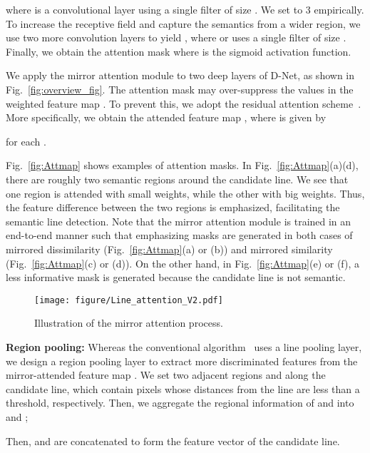 \documentclass[runningheads]{llncs}
\begin{document}
where  is a convolutional layer using a single filter of size . We set  to 3 empirically. To increase the receptive field and capture the semantics from a wider region, we use two more convolution layers to yield , where  or  uses a single filter of size . Finally, we obtain the attention mask  where  is the sigmoid activation function.

We apply the mirror attention module to two deep layers of D-Net, as shown in Fig.~\ref{fig:overview_fig}. The attention mask may over-suppress the values in the weighted feature map . To prevent this, we adopt the residual attention scheme~\cite{wang2017}. More specifically, we obtain the attended feature map , where  is given by

for each .

Fig.~\ref{fig:Attmap} shows examples of attention masks. In Fig.~\ref{fig:Attmap}(a)(d), there are roughly two semantic regions around the candidate line. We see that one region is attended with small weights, while the other with big weights. Thus, the feature difference between the two regions is emphasized, facilitating the semantic line detection. Note that the mirror attention module is trained in an end-to-end manner such that emphasizing masks are generated in both cases of mirrored dissimilarity (Fig.~\ref{fig:Attmap}(a) or (b)) and mirrored similarity (Fig.~\ref{fig:Attmap}(c) or (d)). On the other hand, in Fig.~\ref{fig:Attmap}(e) or (f), a less informative mask is generated because the candidate line is not semantic.

\begin{figure*}[t]

  \centering
  \texttt{[image: figure/Line\_attention\_V2.pdf]}


  \caption{Illustration of the mirror attention process.}
  \label{fig:mirror_attention}

\end{figure*}



\noindent\textbf{Region pooling:} Whereas the conventional algorithm~\cite{lee2017} uses a line pooling layer, we design a region pooling layer to extract more discriminated features from the mirror-attended feature map . We set two adjacent regions  and  along the candidate line, which contain pixels whose distances from the line are less than a threshold, respectively. Then, we aggregate the regional information of  and  into  and  ;

Then,  and  are concatenated to form the feature vector of the candidate line.
\end{document}
